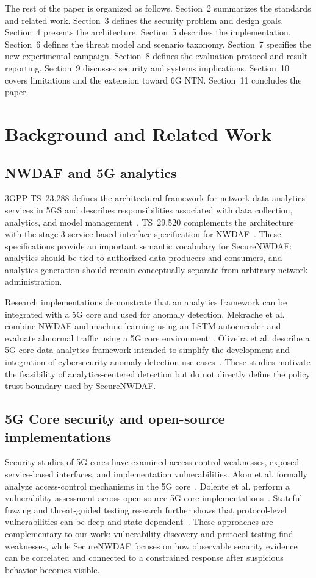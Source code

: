 \documentclass[sigconf,review]{acmart}
\begin{document}
The rest of the paper is organized as follows. Section~2 summarizes the standards and related work. Section~3 defines the security problem and design goals. Section~4 presents the architecture. Section~5 describes the implementation. Section~6 defines the threat model and scenario taxonomy. Section~7 specifies the new experimental campaign. Section~8 defines the evaluation protocol and result reporting. Section~9 discusses security and systems implications. Section~10 covers limitations and the extension toward 6G NTN. Section~11 concludes the paper.

\section{Background and Related Work}
\subsection{NWDAF and 5G analytics}
3GPP TS~23.288 defines the architectural framework for network data analytics services in 5GS and describes responsibilities associated with data collection, analytics, and model management~\cite{ts23288}. TS~29.520 complements the architecture with the stage-3 service-based interface specification for NWDAF~\cite{ts29520}. These specifications provide an important semantic vocabulary for SecureNWDAF: analytics should be tied to authorized data producers and consumers, and analytics generation should remain conceptually separate from arbitrary network administration.

Research implementations demonstrate that an analytics framework can be integrated with a 5G core and used for anomaly detection. Mekrache et al. combine NWDAF and machine learning using an LSTM autoencoder and evaluate abnormal traffic using a 5G core environment~\cite{mlnwdaf}. Oliveira et al. describe a 5G core data analytics framework intended to simplify the development and integration of cybersecurity anomaly-detection use cases~\cite{oliveira2024}. These studies motivate the feasibility of analytics-centered detection but do not directly define the policy trust boundary used by SecureNWDAF.

\subsection{5G Core security and open-source implementations}
Security studies of 5G cores have examined access-control weaknesses, exposed service-based interfaces, and implementation vulnerabilities. Akon et al. formally analyze access-control mechanisms in the 5G core~\cite{akon2023}. Dolente et al. perform a vulnerability assessment across open-source 5G core implementations~\cite{dolente2024}. Stateful fuzzing and threat-guided testing research further shows that protocol-level vulnerabilities can be deep and state dependent~\cite{5gcfuzz,corecrisis}. These approaches are complementary to our work: vulnerability discovery and protocol testing find weaknesses, while SecureNWDAF focuses on how observable security evidence can be correlated and connected to a constrained response after suspicious behavior becomes visible.
\end{document}

